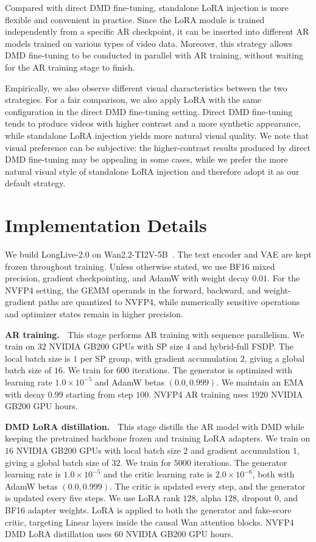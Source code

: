 Compared with direct DMD fine-tuning, standalone LoRA injection is more flexible and convenient in practice. Since the LoRA module is trained independently from a specific AR checkpoint, it can be inserted into different AR models trained on various types of video data. Moreover, this strategy allows DMD fine-tuning to be conducted in parallel with AR training, without waiting for the AR training stage to finish. 

Empirically, we also observe different visual characteristics between the two strategies. For a fair comparison, we also apply LoRA with the same configuration in the direct DMD fine-tuning setting. Direct DMD fine-tuning tends to produce videos with higher contrast and a more synthetic appearance, while standalone LoRA injection yields more natural visual quality. 
We note that visual preference can be subjective: the higher-contrast results produced by direct DMD fine-tuning may be appealing in some cases, while we prefer the more natural visual style of standalone LoRA injection and therefore adopt it as our default strategy.

\section{Implementation Details}\label{ap:implementation_details}

We build LongLive-2.0 on Wan2.2-TI2V-5B~\cite{wan}. The text encoder and VAE are kept frozen throughout training. Unless otherwise stated, we use BF16 mixed precision, gradient checkpointing, and AdamW with weight decay $0.01$. For the NVFP4 setting, the GEMM operands in the forward, backward, and weight-gradient paths are quantized to NVFP4, while numerically sensitive operations and optimizer states remain in higher precision.

\textbf{AR training.} $\;$
This stage performs AR training with sequence parallelism. 
We train on $32$ NVIDIA GB200 GPUs with SP size $4$ and hybrid-full FSDP.
The local batch size is $1$ per SP group, with gradient accumulation $2$, giving a global batch size of $16$.
We train for $600$ iterations.
The generator is optimized with learning rate $1.0{\times}10^{-5}$ and AdamW betas $(0.0,0.999)$. We maintain an EMA with decay $0.99$ starting from step $100$.
NVFP4 AR training uses $1920$ NVIDIA GB200 GPU hours.

\textbf{DMD LoRA distillation.} $\;$
This stage distills the AR model with DMD while keeping the pretrained backbone frozen and training LoRA adapters. 
We train on $16$ NVIDIA GB200 GPUs with local batch size $2$ and gradient accumulation $1$, giving a global batch size of $32$.
We train for $5000$ iterations. 
The generator learning rate is $1.0{\times}10^{-5}$ and the critic learning rate is $2.0{\times}10^{-6}$, both with AdamW betas $(0.0,0.999)$. 
The critic is updated every step, and the generator is updated every five steps. 
We use LoRA rank $128$, alpha $128$, dropout $0$, and BF16 adapter weights. 
LoRA is applied to both the generator and fake-score critic, targeting Linear layers inside the causal Wan attention blocks.
NVFP4 DMD LoRA distillation uses $60$ NVIDIA GB200 GPU hours.

